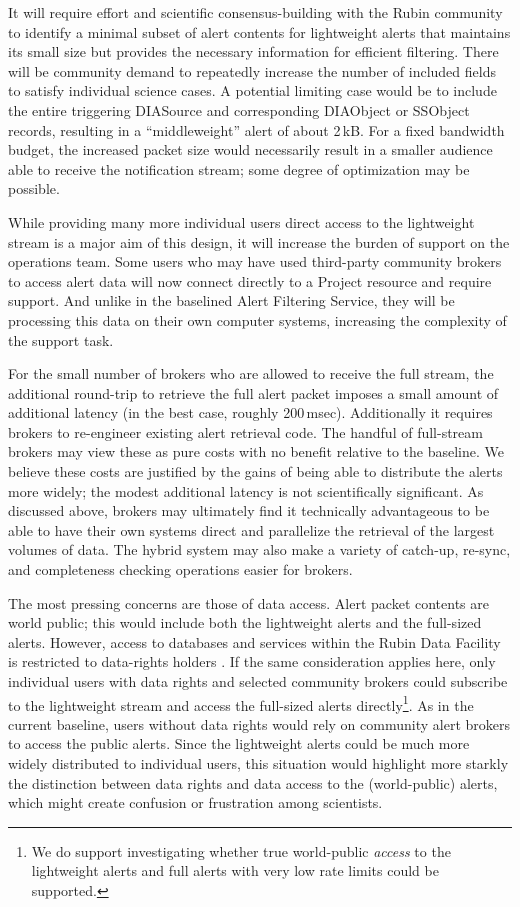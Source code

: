 \documentclass[DM,authoryear,toc]{lsstdoc}
\begin{document}
It will require effort and scientific consensus-building with the Rubin community to identify a minimal subset of alert contents for lightweight alerts that maintains its small size but provides the necessary information for efficient filtering.
There will be community demand to repeatedly increase the number of included fields to satisfy individual science cases.
A potential limiting case would be to include the entire triggering DIASource and corresponding DIAObject or SSObject records, resulting in a ``middleweight'' alert of about 2\,kB.
For a fixed bandwidth budget, the increased packet size would necessarily result in a smaller audience able to receive the notification stream; some degree of optimization may be possible.

While providing many more individual users direct access to the lightweight stream is a major aim of this design, it will increase the burden of support on the operations team.
Some users who may have used third-party community brokers to access alert data will now connect directly to a Project resource and require support.
And unlike in the baselined Alert Filtering Service, they will be processing this data on their own computer systems, increasing the complexity of the support task.

For the small number of brokers who are allowed to receive the full stream, the additional round-trip to retrieve the full alert packet imposes a small amount of additional latency (in the best case, roughly 200\,msec).
Additionally it requires brokers to re-engineer existing alert retrieval code.
The handful of full-stream brokers may view these as pure costs with no benefit relative to the baseline.
We believe these costs are justified by the gains of being able to distribute the alerts more widely; the modest additional latency is not scientifically significant.
As discussed above, brokers may ultimately find it technically advantageous to be able to have their own systems direct and parallelize the retrieval of the largest volumes of data.
The hybrid system may also make a variety of catch-up, re-sync, and completeness checking operations easier for brokers.

The most pressing concerns are those of data access.
Alert packet contents are world public; this would include both the lightweight alerts and the full-sized alerts.
However, access to databases and services within the Rubin Data Facility is restricted to data-rights holders .
If the same consideration applies here, only individual users with data rights and selected community brokers could subscribe to the lightweight stream and access the full-sized alerts directly\footnote{We do support investigating whether true world-public \textit{access} to the lightweight alerts and full alerts with very low rate limits could be supported.}.
As in the current baseline, users without data rights would rely on community alert brokers to access the public alerts.
Since the lightweight alerts could be much more widely distributed to individual users, this situation would highlight more starkly the distinction between data rights and data access to the (world-public) alerts, which might create confusion or frustration among scientists.
\end{document}
